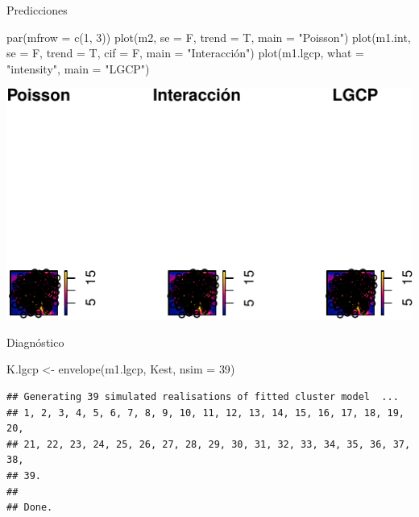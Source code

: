 \documentclass[
  11pt,
  ignorenonframetext,
]{beamer}
\newenvironment{Shaded}{}{}
\newcommand{\AttributeTok}[1]{\textcolor[rgb]{0.49,0.56,0.16}{#1}}
\newcommand{\DecValTok}[1]{\textcolor[rgb]{0.25,0.63,0.44}{#1}}
\newcommand{\FunctionTok}[1]{\textcolor[rgb]{0.02,0.16,0.49}{#1}}
\newcommand{\NormalTok}[1]{#1}
\newcommand{\OtherTok}[1]{\textcolor[rgb]{0.00,0.44,0.13}{#1}}
\newcommand{\StringTok}[1]{\textcolor[rgb]{0.25,0.44,0.63}{#1}}
\begin{document}
\begin{frame}[fragile]{Predicciones}
\protect\hypertarget{predicciones}{}
\begin{Shaded}
\begin{Highlighting}[]
\FunctionTok{par}\NormalTok{(}\AttributeTok{mfrow =} \FunctionTok{c}\NormalTok{(}\DecValTok{1}\NormalTok{, }\DecValTok{3}\NormalTok{))}
\FunctionTok{plot}\NormalTok{(m2, }\AttributeTok{se =}\NormalTok{ F, }\AttributeTok{trend =}\NormalTok{ T, }\AttributeTok{main =} \StringTok{"Poisson"}\NormalTok{)}
\FunctionTok{plot}\NormalTok{(m1.int, }\AttributeTok{se =}\NormalTok{ F, }\AttributeTok{trend =}\NormalTok{ T, }\AttributeTok{cif =}\NormalTok{ F, }\AttributeTok{main =} \StringTok{"Interacción"}\NormalTok{)}
\FunctionTok{plot}\NormalTok{(m1.lgcp, }\AttributeTok{what =} \StringTok{"intensity"}\NormalTok{, }\AttributeTok{main =} \StringTok{"LGCP"}\NormalTok{)}
\end{Highlighting}
\end{Shaded}

\begin{center}\includegraphics{Tutorial-spatstat-2_files/figure-beamer/unnamed-chunk-38-1} \end{center}
\end{frame}

\begin{frame}[fragile]{Diagnóstico}
\protect\hypertarget{diagnuxf3stico}{}
\begin{Shaded}
\begin{Highlighting}[]
\NormalTok{K.lgcp }\OtherTok{\textless{}{-}} \FunctionTok{envelope}\NormalTok{(m1.lgcp, Kest, }\AttributeTok{nsim =} \DecValTok{39}\NormalTok{)}
\end{Highlighting}
\end{Shaded}

\begin{verbatim}
## Generating 39 simulated realisations of fitted cluster model  ...
## 1, 2, 3, 4, 5, 6, 7, 8, 9, 10, 11, 12, 13, 14, 15, 16, 17, 18, 19, 20,
## 21, 22, 23, 24, 25, 26, 27, 28, 29, 30, 31, 32, 33, 34, 35, 36, 37, 38, 
## 39.
## 
## Done.
\end{verbatim}
\end{frame}
\end{document}
